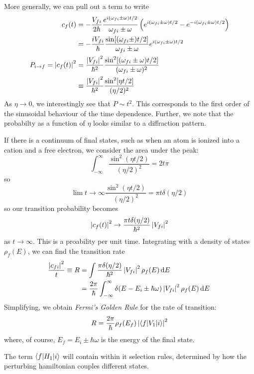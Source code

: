 More generally, we can pull out a term to write
\begin{align*}
	c_f(t) &= -\frac{V_{fi}}{2\hbar} \frac{e^{i(\omega_{fi}\pm \omega)t/2}}{\omega_{fi}\pm\omega}\left(e^{i(\omega_{fi}\pm \omega)t/2}-e^{-i(\omega_{fi}\pm\omega)t/2}\right)\\
	       &=-\frac{iV_{fi}}{\hbar}\frac{\sin[(\omega_{fi}\pm)t/2]}{\omega_{fi}\pm\omega}e^{i(\omega_{fi}\pm \omega)t/2}\\
	P_{i\rightarrow f} = \left|c_f(t)\right|^2&=\frac{\left|V_{fi}\right|^2}{\hbar^2}\frac{\sin^2[(\omega_{fi}\pm\omega)t/2]}{(\omega_{fi}\pm\omega)^2}\\
				   &\equiv \frac{\left|V_{fi}\right|^2}{\hbar^2}\frac{\sin^2[\eta t/2]}{(\eta/2)^2}
\end{align*}
As \(\eta\to 0\), we interestingly see that \(P\sim t^2\). This corresponds to the first order of the sinusoidal behaviour of the time dependence. Further, we note that the probabilty as a function of \(\eta\) looks similar to a diffraction pattern.

If there is a continuum of final states, such as when an atom is ionized into a cation and a free electron, we consider the area under the peak:
\[\int_{-\infty}^\infty \frac{\sin^2(\eta t/2)}{(\eta/2)^2} = 2t\pi\]
so
\[\lim t\to\infty \frac{\sin^2(\eta t/2)}{(\eta/2)^2} = \pi t\delta(\eta/2)\]
so our transition probability becomes
\[\left|c_f(t)\right|^2\rightarrow \frac{\pi t \delta(\eta/2)}{\hbar^2}\left|V_{fi}\right|^2\]
as \(t\to\infty\). This is a proability per unit time. Integrating with a density of states \(\rho_f(E)\), we can find the transition rate
\begin{align*}
	\frac{\abs{c_{fi}}^2}{t}\equiv R &= \int\frac{\pi \delta(\eta/2)}{\hbar^2}\abs{V_{fi}}^2\rho_f(E)\d{E}\\
					 &=\frac{2\pi}{\hbar}\int_{-\infty}^\infty\delta(E-E_i\pm \hbar\omega)\abs{V_{fi}}^2\rho_f(E)\d{E}
\end{align*}
Simplifying, we obtain \emph{Fermi's Golden Rule} for the rate of transition:
\begin{equation}
	R = \frac{2\pi}{\hbar}\rho_f(E_f) \left|\langle f\rvert V_1\lvert i\rangle\right|^2
\end{equation}
where, of course, \(E_f = E_i\pm \hbar\omega\) is the energy of the final state.

The term \(\langle f\rvert H_1\lvert i\rangle\) will contain within it selection rules, determined by how the perturbing hamiltonian couples different states.

